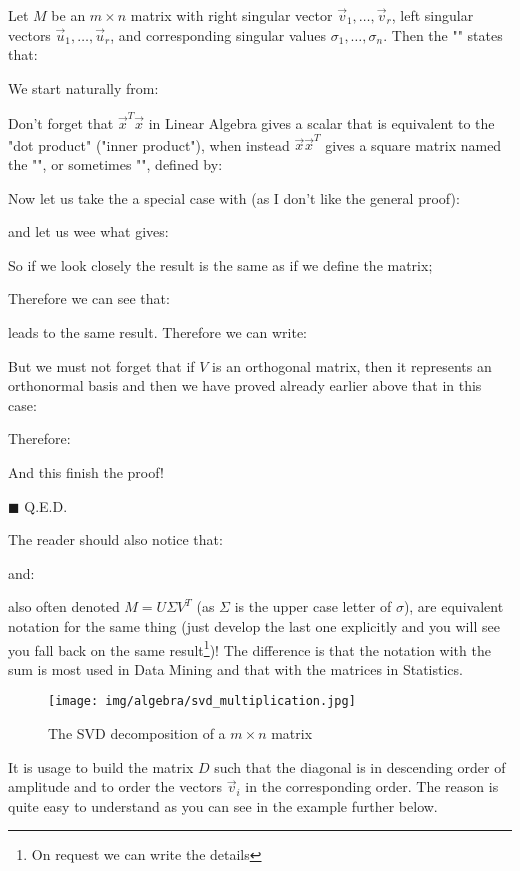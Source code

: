	\begin{theorem}
	Let $M$ be an $m\times n$ matrix with right singular vector $\vec{v}_1,\ldots,\vec{v}_r$, left singular vectors $\vec{u}_1,\ldots,\vec{u}_r$, and corresponding singular values $\sigma_1,\ldots,\sigma_n$. Then the "" states that:
	
	\end{theorem}
	\begin{dem}
	We start naturally from:
	
	\begin{tcolorbox}[title=Remark,colframe=black,arc=10pt]
	Don't forget that $\vec{x}^T\vec{x}$ in Linear Algebra gives a scalar that is equivalent to the "dot product" ("inner product"), when instead $\vec{x}\vec{x}^T$ gives a square matrix named the "\label{outer product}", or sometimes "\label{Gram matrix}", defined by:
	
	\end{tcolorbox}
	Now let us take the a special case with (as I don't like the general proof):
	

	and let us wee what gives:
	
	So if we look closely the result is the same as if we define the matrix;
	
	Therefore we can see that:
	
	leads to the same result. Therefore we can write:
	
	But we must not forget that if  $V$ is an orthogonal matrix, then it represents an orthonormal basis and then we have proved already earlier above that in this case:
	
	Therefore:
	
	And this finish the proof!
	\begin{flushright}
		$\blacksquare$  Q.E.D.
	\end{flushright}
	\end{dem}
	The reader should also notice that:
	
	and:
	
	also often denoted $M=U\Sigma V^T$ (as $\Sigma$ is the upper case letter of $\sigma$), are equivalent notation for the same thing (just develop the last one explicitly and you will see you fall back on the same result\footnote{On request we can write the details})! The difference is that the notation with the sum is most used in Data Mining and that with the matrices in Statistics.
	\begin{figure}[H]
		\centering
		\texttt{[image: img/algebra/svd\_multiplication.jpg]}
		\caption{The SVD decomposition of a $m\times n$ matrix}
	\end{figure}
	It is usage to build the matrix $D$ such that the diagonal is in descending order of amplitude and to order the vectors $\vec{v}_i$ in the corresponding order. The reason is quite easy to understand as you can see in the example further below.
	
